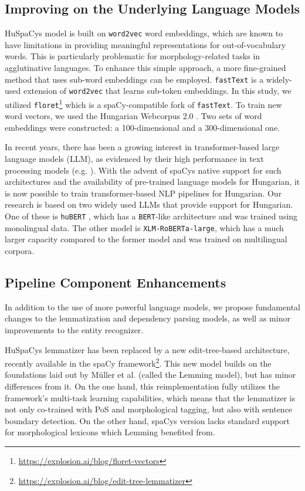\documentclass[runningheads,a4paper]{llncs}
\newcommand{\spacy}{spaCy}
\newcommand{\huspacy}{HuSpaCy}
\newcommand{\floret}{\texttt{floret}}
\newcommand{\fasttext}{\texttt{fastText}}
\newcommand{\wordtovec}{\texttt{word2vec}}
\newcommand{\lemming}{Lemming}
\newcommand{\hubert}{\texttt{huBERT}}
\newcommand{\bert}{\texttt{BERT}}
\newcommand{\xlmroberta}{\texttt{XLM-RoBERTa-large}}
\begin{document}
\subsection{Improving on the Underlying Language Models} \label{sec:methods:underlying}

\huspacy\textquotesingle s model is built on \wordtovec{} \cite{word2vec} word embeddings, which are known to have limitations in providing meaningful representations for out-of-vocabulary words. This is particularly problematic for morphology-related tasks in agglutinative languages. To enhance this simple approach, a more fine-grained method that uses sub-word embeddings can be employed. \fasttext{} \cite{bojanowski2017enriching} is a widely-used extension of \wordtovec{} that learns sub-token embeddings. In this study, we utilized \floret\footnote{\url{https://explosion.ai/blog/floret-vectors}} which is a \spacy-compatible fork of \fasttext. To train new word vectors, we used the Hungarian Webcorpus 2.0 \cite{hubert}. Two sets of word embeddings were constructed: a 100-dimensional and a 300-dimensional one.

In recent years, there has been a growing interest in transformer-based large language models (LLM), as evidenced by their high performance in text processing models (e.g. \cite{hubert,enevoldsen2021dacy}). With the advent of \spacy\textquotesingle s native support for such architectures and the availability of pre-trained language models for Hungarian, it is now possible to train transformer-based NLP pipelines for Hungarian. Our research is based on two widely used LLMs that provide support for Hungarian. One of these is \hubert{} \cite{hubert}, which has a \bert-like architecture and was trained using monolingual data. The other model is \xlmroberta{}, which has a much larger capacity compared to the former model and was trained on multilingual corpora.


\subsection{Pipeline Component Enhancements} \label{sec:methods:enchancements}

In addition to the use of more powerful language models, we propose fundamental changes to the lemmatization and dependency parsing models, as well as minor improvements to the entity recognizer.

\huspacy\textquotesingle s lemmatizer has been replaced by a new edit-tree-based architecture, recently available in the \spacy{} framework\footnote{\url{https://explosion.ai/blog/edit-tree-lemmatizer}}. This new model builds on the foundations laid out by Müller et al. \cite{muller-etal-2015-joint} (called the \lemming{} model), but has minor differences from it. On the one hand, this reimplementation fully utilizes the framework’s multi-task learning capabilities, which means that the lemmatizer is not only co-trained with PoS and morphological tagging, but also with sentence boundary detection. On the other hand, \spacy\textquotesingle s version lacks standard support for morphological lexicons which \lemming{} benefited from.
\end{document}
